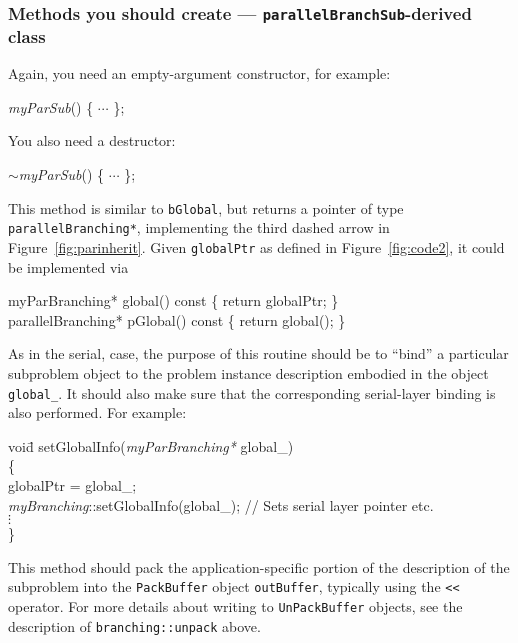 ~

\subsubsection{Methods you should create ---
  \texttt{parallelBranchSub}-derived class}
\label{sec:parsubmethods}
Again, you need an empty-argument constructor, for example:
\begin{codeblock}
\emph{myParSub}() \{  $\cdots$ \}; \\
\end{codeblock}

You also need a destructor:
\begin{codeblock}
$\sim$\emph{myParSub}() \{ $\cdots$ \}; \\
\end{codeblock}

This method is similar to \texttt{bGlobal}, but returns a pointer of
type \texttt{parallelBranching*}, implementing the third dashed arrow
in Figure~\ref{fig:parinherit}.  Given \texttt{globalPtr} as defined
in Figure~\ref{fig:code2}, it could be implemented via
\begin{codeblock}
myParBranching* global() const \{ return globalPtr; \} \\
parallelBranching* pGlobal() const \{ return global(); \}
\end{codeblock}

As in the
serial, case, the purpose of this routine should be to ``bind'' a
particular subproblem object to the problem instance description embodied in
the object \texttt{global\_}.  It should also make sure that the
corresponding serial-layer binding is also performed.  For example:
\begin{codeblock}
voi\=d setGlobalInfo(\emph{myParBranching*} global\_) \\
\{ \\
\> globalPtr = global\_; \\
\> \emph{myBranching}::setGlobalInfo(global\_);
  // Sets serial layer pointer etc. \\
\> $\vdots$\\
\}
\end{codeblock}

This method should pack the application-specific portion of the 
description of the subproblem into the \texttt{PackBuffer} object
\texttt{outBuffer}, typically using the \texttt{<<} operator.  For
more details about writing to \texttt{UnPackBuffer} objects, see the
description of \texttt{branching::unpack} above.

